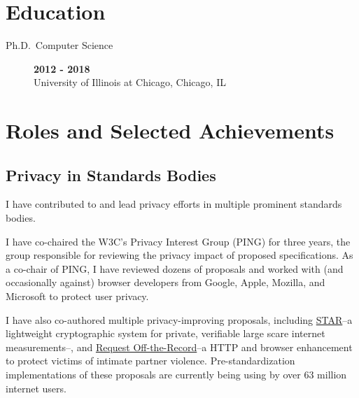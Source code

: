 \documentclass[wideaddress]{vitae}
\begin{document}
  \section{Education}
  \begin{description}
    \item[Ph.D.~Computer Science] \hfill \textbf{2012 - 2018}\\
    University of Illinois at Chicago, Chicago, IL
  \end{description}

  \section{Roles and Selected Achievements}

  \subsection{Privacy in Standards Bodies}
  \begin{description}
    \item{\noindent I have contributed to and lead privacy efforts in multiple
    prominent standards bodies.}

    \item{\noindent I have co-chaired the W3C's Privacy Interest
    Group (PING) for three years, the group responsible for reviewing the privacy
    impact of proposed specifications. As a co-chair of PING, I have reviewed
    dozens of proposals and worked with (and occasionally against) browser
    developers from Google, Apple, Mozilla, and Microsoft to protect
    user privacy.}

    \item{\noindent I have also co-authored multiple privacy-improving
    proposals, including \href{https://datatracker.ietf.org/doc/draft-dss-star/}{STAR}--a
    lightweight cryptographic system for private, verifiable large scare internet measurements--,
    and \href{https://datatracker.ietf.org/doc/draft-sahib-httpbis-off-the-record/}{Request Off-the-Record}--a
    HTTP and browser enhancement to protect victims of intimate partner violence.
    Pre-standardization implementations of these proposals are currently being
    using by over 63 million internet users.}
  \end{description}
\end{document}
